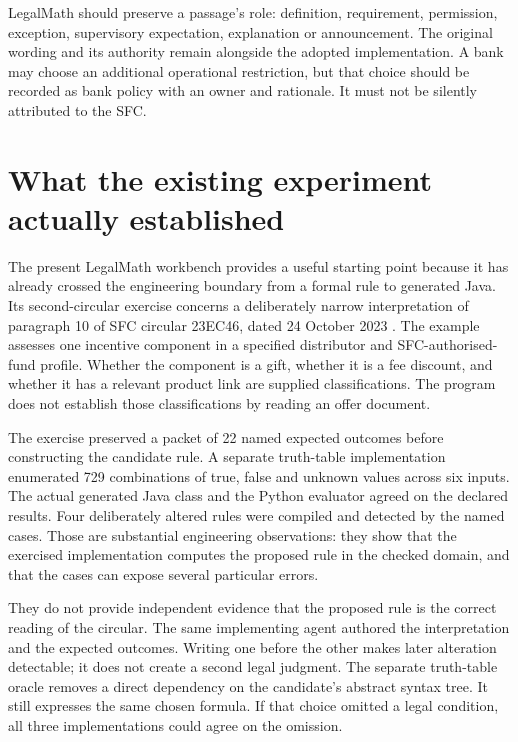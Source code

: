 \documentclass[12pt,a4paper,oneside,openany]{book}
\begin{document}
LegalMath should preserve a passage's role: definition, requirement, permission,
exception, supervisory expectation, explanation or announcement. The original
wording and its authority remain alongside the adopted implementation. A bank may
choose an additional operational restriction, but that choice should be recorded
as bank policy with an owner and rationale. It must not be silently attributed to
the SFC.

\section{What the existing experiment actually established}
\label{merge:M01:01}

\label{sec:problem-evidence}
The present LegalMath workbench provides a useful starting point because it has
already crossed the engineering boundary from a formal rule to generated Java.
Its second-circular exercise concerns a deliberately narrow interpretation of
paragraph 10 of SFC circular 23EC46, dated 24 October 2023
\citep{sfcmarketing}. The example assesses one incentive component in a specified
distributor and SFC-authorised-fund profile. Whether the component is a gift,
whether it is a fee discount, and whether it has a relevant product link are
supplied classifications. The program does not establish those classifications
by reading an offer document.

The exercise preserved a packet of 22 named expected outcomes before constructing
the candidate rule. A separate truth-table implementation enumerated 729
combinations of true, false and unknown values across six inputs. The actual
generated Java class and the Python evaluator agreed on the declared results.
Four deliberately altered rules were compiled and detected by the named cases.
Those are substantial engineering observations: they show that the exercised
implementation computes the proposed rule in the checked domain, and that the
cases can expose several particular errors.

They do not provide independent evidence that the proposed rule is the correct
reading of the circular. The same implementing agent authored the interpretation
and the expected outcomes. Writing one before the other makes later alteration
detectable; it does not create a second legal judgment. The separate truth-table
oracle removes a direct dependency on the candidate's abstract syntax tree. It
still expresses the same chosen formula. If that choice omitted a legal
condition, all three implementations could agree on the omission.
\end{document}
